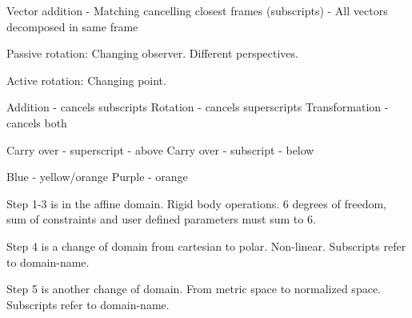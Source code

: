 
\makeatletter
\let\@seccntformat\@oldseccntformat
\let\subsubsection\oldsubsubsection
\makeatother

Vector addition
- Matching cancelling closest frames (subscripts)
- All vectors decomposed in same frame

Passive rotation:
Changing observer. Different perspectives. 

Active rotation:
Changing point.


Addition - cancels subscripts
Rotation - cancels superscripts
Transformation - cancels both

Carry over - superscript - above
Carry over - subscript - below

Blue - yellow/orange
Purple - orange

Step 1-3 is in the affine domain. Rigid body operations. 6 degrees of freedom, sum of constraints and user defined parameters must sum to 6.

Step 4 is a change of domain from cartesian to polar. Non-linear. Subscripts refer to domain-name.

Step 5 is another change of domain. From metric space to normalized space. Subscripts refer to domain-name.


